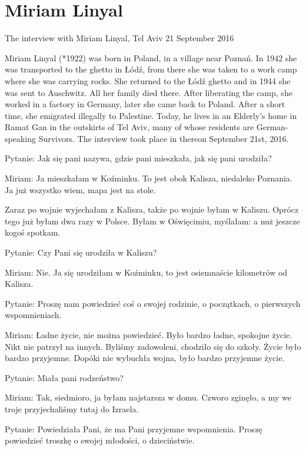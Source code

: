 \section{Miriam Linyal}

The interview with Miriam Linyal, Tel Aviv 21 September 2016 

 Miriam Linyal (*1922) was born in Poland, in a village near Poznań. In 1942 she was transported to the ghetto in Łódź, from there she was taken to a work camp where she was carrying rocks. She returned to the Łódź ghetto and in 1944 she was sent to Auschwitz. All her family died there. After liberating the camp, she worked in a factory in Germany, later she came back to Poland. After a short time, she emigrated illegally to Palestine. Today, he lives in an Elderly’s home in Ramat Gan in the outskirts of Tel Aviv, many of whose residents are German-speaking Survivors. The interview took place in thereon September 21st, 2016. 

Pytanie: Jak się pani nazywa, gdzie pani mieszkała, jak się pani urodziła? 

Miriam: Ja mieszkałam w Koźminku. To jest obok Kalisza, niedaleko Poznania. Ja już wszystko wiem, mapa jest na stole.  

Zaraz po wojnie wyjechałam z Kalisza, także po wojnie byłam w Kaliszu. Oprócz tego już byłam dwa razy w Polsce. Byłam w Oświęcimiu, myślałam: a nuż jeszcze kogoś spotkam. 

 

Pytanie: Czy Pani się urodziła w Kaliszu? 

Miriam: Nie. Ja się urodziłam w Koźminku, to jest osiemnaście kilometrów od Kalisza. 

 

Pytanie: Proszę nam powiedzieć coś o swojej rodzinie, o początkach, o pierwszych wspomnieniach. 

Miriam: Ładne życie, nie można powiedzieć. Było bardzo ładne, spokojne życie. Nikt nie patrzył na innych. Byliśmy zadowoleni, chodziło się do szkoły. Życie było bardzo przyjemne. Dopóki nie wybuchła wojna, było bardzo przyjemne życie. 

 

Pytanie: Miała pani rodzeństwo? 

Miriam: Tak, siedmioro, ja byłam najstarsza w domu. Czworo zginęło, a my we troje przyjechaliśmy tutaj do Izraela. 

 

Pytanie: Powiedziała Pani, że ma Pani przyjemne wspomnienia. Proszę powiedzieć troszkę o swojej młodości, o dzieciństwie. 

